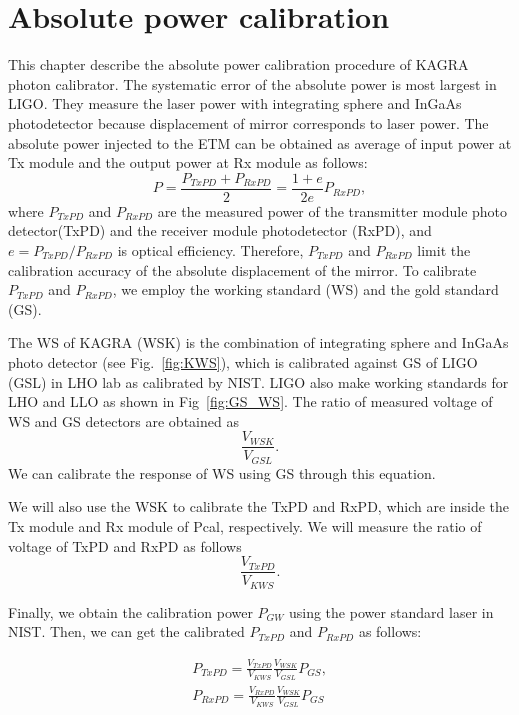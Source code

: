 
\chapter{Absolute power calibration} %
\label{Chapter5} %
This chapter describe the absolute power calibration procedure of KAGRA photon calibrator.
The systematic error of the absolute power is most largest in LIGO.
They measure the laser power with integrating sphere and InGaAs photodetector because displacement of mirror corresponds to laser power. 
The absolute power injected to the ETM can be obtained as average of input power at Tx module and the output power at Rx module as follows:
\begin{equation}
P=\frac{P_{TxPD}+P_{RxPD}}{2}=\frac{1+e}{2e}P_{RxPD},
\end{equation}
where $P_{TxPD}$ and $P_{RxPD}$ are the measured power of the transmitter module photo detector(TxPD) and the receiver module photodetector (RxPD), and $e=P_{TxPD}/P_{RxPD}$ is optical efficiency.
Therefore, $P_{TxPD}$ and $P_{RxPD}$ limit the calibration accuracy of the absolute displacement of the mirror.
To calibrate $P_{TxPD}$ and $P_{RxPD}$, we employ the working standard (WS) and the gold standard (GS). 

The WS of KAGRA (WSK) is the combination of integrating sphere and InGaAs photo detector (see Fig.~\ref{fig:KWS}), which is calibrated against GS of LIGO (GSL) in LHO lab as calibrated by NIST. LIGO also make working standards for LHO and LLO as shown in Fig~\ref{fig:GS_WS}.
The ratio of measured voltage of WS and GS detectors are obtained as
\begin{equation}
\frac{V_{WSK}}{V_{GSL}}.
\end{equation}
We can calibrate the response of WS using GS through this equation.

We will also use the WSK to calibrate the TxPD and RxPD, which are inside the Tx module and Rx module of Pcal, respectively. We will measure the ratio of voltage of TxPD and RxPD as follows
\begin{equation}
\frac{V_{TxPD}}{V_{KWS}}.
\end{equation}

Finally,  we obtain the calibration power $P_{GW}$ using the power standard laser in NIST.
Then, we can get the calibrated $P_{TxPD}$ and $P_{RxPD}$ as follows:

\begin{eqnarray}
P_{TxPD}=\frac{V_{TxPD}}{V_{KWS}}\frac{V_{WSK}}{V_{GSL}}P_{GS}, \\
P_{RxPD}=\frac{V_{RxPD}}{V_{KWS}}\frac{V_{WSK}}{V_{GSL}}P_{GS}
\end{eqnarray}

